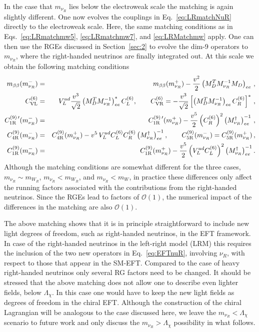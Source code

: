 \documentclass[letterpaper,11pt]{article}
\newcommand{\bt}{\beta}
\newcommand{\bea}{\begin{eqnarray}}
\newcommand{\eea}{\end{eqnarray}}
\newcommand{\Or}{\mathcal O}
\newcommand{\sq}{^{2}}
\newcommand{\nn}{\nonumber}
\begin{document}
In the case that $m_{\nu_R}$ lies below the electroweak scale the matching is again slightly different. One now evolves the couplings in Eq.\ \eqref{eq:LRmatchNuR} directly to the electroweak scale. Here, the same matching conditions as in Eqs.\ \eqref{eq:LRmatchmw5}, \eqref{eq:LRmatchmw7}, and \eqref{eq:LRMatchmw} apply. One can then  use the RGEs discussed in Section\ \ref{sec:2} to evolve the dim-9 operators to $m_{\nu_R}$, where the right-handed neutrinos are finally integrated out. At this scale we obtain the following matching conditions
\bea
m_{\bt\bt}(m_{\nu_R}^-) &=& m_{\bt\bt}(m_{\nu_R}^+) - {\frac{v\sq}{2}} \left(M_D^T M_{\nu_R}^{-1}M_D\right)_{ee}\,,\nn\\
C_{\rm VL}^{(6)}&=&V_L^{ud }\frac{v^3}{\sqrt{2}} \left(M_D^T M_{\nu_R}^{-1}\right)_{ee}^*  C_L^{(6)},\qquad C_{\rm VR}^{(6)}=-\frac{v^3}{\sqrt{2}} \left[\left(M_D^T M_{\nu_R}^{-1}\right)_{ee}C_R^{(6)}\right]^*  \,,\nn\\
C_{\rm 1R}^{(9)\,\prime}(m_{\nu_R}^-) &=&C_{\rm 1R}^{(9)\,\prime}(m_{\nu_R}^+) - \frac{v^5}{2}\left(C_R^{(6)}\right)\sq \left(M_{\nu_R}^\dagger\right)^{-1}_{ee}\,,
\nn \\
 C_{\rm 4R}^{(9)}(m_{\nu_R}^-) &=&  C_{\rm 4R}^{(9)}(m_{\nu_R}^+) -v^5\,V_L^{ud}C_L^{(6)}C_R^{(6)} \left(M_{\nu_R}^\dagger\right)^{-1}_{ee},
\qquad  C_{\rm 5R}^{(9)}(m_{\nu_R}^-) =  C_{\rm 5R}^{(9)}(m_{\nu_R}^+)\,, \nn \\
C_{\rm 1R}^{(9)}(m_{\nu_R}^-) &=& C_{\rm 1R}^{(9)}(m_{\nu_R}^+)-\frac{v^5}{2}\left(V_L^{ud}C_L^{(6)}\right)\sq \left(M_{\nu_R}^\dagger\right)^{-1}_{ee}.
\eea
Although the matching conditions are somewhat different for the three cases, $m_{\nu_R}\sim m_{W_R}$, $m_{\nu_R}< m_{W_R}$, and $m_{\nu_R}< m_{W}$, in practice these differences only affect the running factors associated with the contributions from the right-handed neutrinos. Since the RGEs lead to factors of $\Or(1)$, the numerical impact of the differences in the matching are also  $\Or(1)$.

The above matching shows that it is in principle straightforward to include new light degrees of freedom, such as right-handed neutrinos, in the EFT framework. In case of the right-handed neutrinos in the left-right model (LRM) this  requires the inclusion of the two new operators in Eq.\ \eqref{eq:EFTnuR}, involving $\nu_R$, with respect to those that appear in the SM-EFT. Compared to the case of heavy right-handed neutrinos only several RG factors need to be changed. It should be stressed that the above matching does not allow one to describe even lighter fields, below $\Lambda_\chi$. In this case one would have to keep the new light fields as degrees of freedom in the chiral EFT. Although the construction of the chiral Lagrangian will be analogous to the case discussed here, we leave the $m_{\nu_R}<\Lambda_\chi$ scenario to future work and only discuss the $m_{\nu_R}>\Lambda_\chi$ possibility in what follows.
\end{document}
